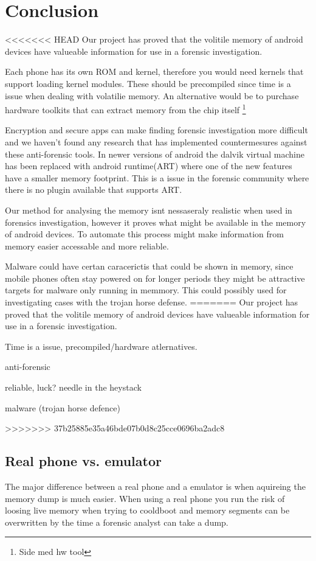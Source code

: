 \section{Conclusion}
<<<<<<< HEAD
Our project has proved that the volitile memory of android devices have valueable information for use 
in a forensic investigation.

Each phone has its own ROM and kernel, therefore you would need kernels that support loading kernel 
modules. These should be precompiled since time is a issue when dealing with volatilie memory. An 
alternative would be to purchase hardware toolkits that can extract memory from the chip itself 
\footnote{Side med hw tool}

Encryption and secure apps can make finding forensic investigation more difficult and we haven't found 
any research that has implemented countermesures against these anti-forensic tools. In newer versions 
of android the dalvik virtual machine has been replaced with android runtime(ART) where one of the new 
features have a smaller memory footprint. This is a issue in the forensic community where there is no 
plugin available that supports ART.

Our method for analysing the memory isnt nessaseraly realistic when used in forensics investigation, however it proves what might be available in the memory of android devices. To automate this process might make information from memory easier accessable and more reliable.

Malware could have certan caracerictis that could be shown in memory, since mobile phones often stay 
powered on for longer periods they might be attractive targets for malware only running in memmory. 
This could possibly used for investigating cases with the trojan horse defense.
=======
Our project has proved that the volitile memory of android devices have valueable information for use in a forensic investigation.

Time is a issue, precompiled/hardware atlernatives.

anti-forensic

reliable, luck? needle in the heystack

malware (trojan horse defence)

>>>>>>> 37b25885e35a46bde07b0d8c25cce0696ba2adc8

\subsection{Real phone vs. emulator}
The major difference between a real phone and a emulator is when aquireing the memory dump is much 
easier. When using a real phone you run the risk of loosing live memory when trying to cooldboot and 
memory segments can be overwritten by the time a forensic analyst can take a dump.

